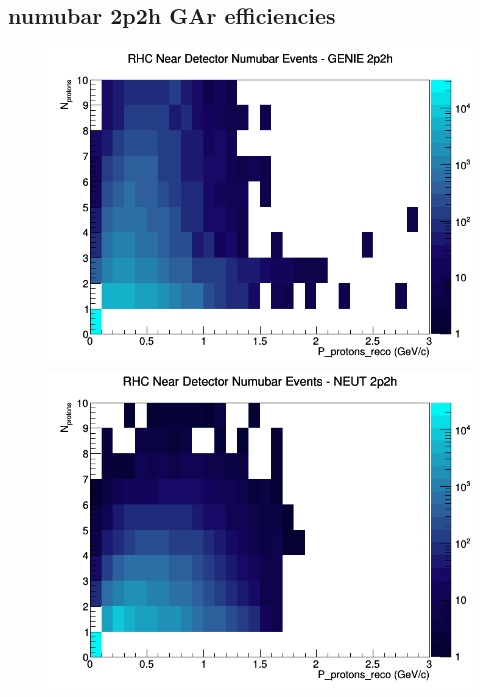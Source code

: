 \subsection{numubar 2p2h GAr efficiencies}
\begin{figure}[h]
\includegraphics[width=\linewidth]{eff_N_P/GAr/protons/2p2h_RHC_ND_numubar_N_P_GENIE.png}
\endminipage
{}
\includegraphics[width=\linewidth]{eff_N_P/GAr/protons/2p2h_RHC_ND_numubar_N_P_NEUT.png}
\endminipage
{}

\end{figure}
